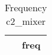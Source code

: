 \begin{table}[htbp]\centering
\def\sym#1{\ifmmode^{#1}\else\(^{#1}\)\fi}
\caption{Frequency c2\_mixer \label{tab:"label"}}
\begin{tabular*}{0.9\hsize}{@{\hskip\tabcolsep\extracolsep\fill}l*{1}{c}}
\toprule
                                &     freq\\
\midrule
\bottomrule
\end{tabular*}
\end{table}
